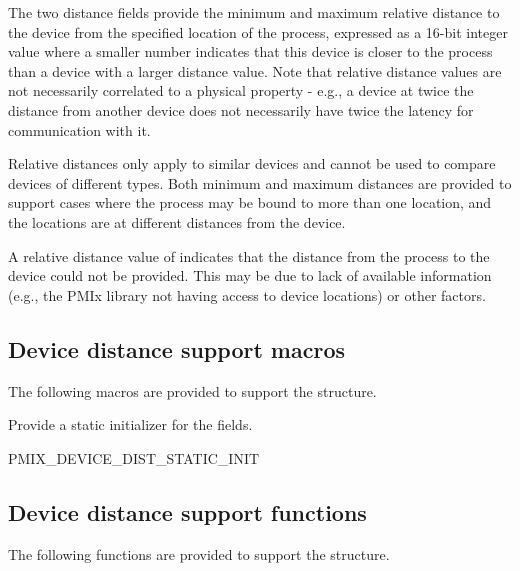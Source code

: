 The two distance fields provide the minimum and maximum relative distance to the device from the specified location of the process, expressed as a 16-bit integer value where a smaller number indicates that this device is closer to the process than a device with a larger distance value. Note that relative distance values are not necessarily correlated to a physical property - e.g., a device at twice the distance from another device does not necessarily have twice the latency for communication with it.

Relative distances only apply to similar devices and cannot be used to compare devices of different types. Both minimum and maximum distances are provided to support cases where the process may be bound to more than one location, and the locations are at different distances from the device.

A relative distance value of  indicates that the distance from the process to the device could not be provided. This may be due to lack of available information (e.g., the \ac{PMIx} library not having access to device locations) or other factors.


\subsection{Device distance support macros}
\label{api:netenddist:macros}

The following macros are provided to support the  structure.


Provide a static initializer for the  fields.

\cspecificstart
\begin{codepar}
PMIX_DEVICE_DIST_STATIC_INIT
\end{codepar}
\cspecificend


\subsection{Device distance support functions}
\label{api:netenddist:macros}

The following functions are provided to support the  structure.

